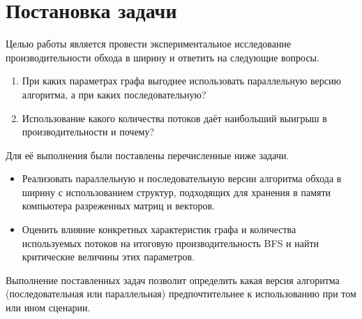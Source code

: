 
\section{Постановка задачи}
\label{sec:task}
 Целью работы является провести экспериментальное исследование производительности обхода в ширину и ответить на следующие вопросы. 
\begin{enumerate}
    \item При каких параметрах графа выгоднее использовать параллельную версию алгоритма, а при каких последовательную?
    \item Использование какого количества потоков даёт наибольший выигрыш в производительности и почему?
\end{enumerate}

 Для её выполнения были постав\-лены перечисленные ниже задачи.
 \begin{itemize}
 	\item Реализовать параллельную и последовательную версии алгоритма обхода в ширину с использованием структур, подходящих для хранения в памяти компьютера разреженных матриц и векторов.
 	\item  Оценить влияние конкретных характеристик графа и количества используемых потоков на итоговую производительность BFS и найти критические величины этих параметров.
 \end{itemize}

Выполнение поставленных задач позволит определить какая версия алгоритма (последовательная или параллельная) предпочтительнее к использованию при том или ином сценарии.
